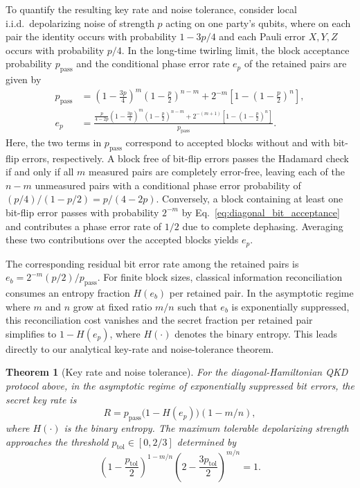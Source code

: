 \documentclass[onecolumn,prx,longbibliography,nofootinbib, superscriptaddress]{revtex4-2}
\newtheorem{theorem}{Theorem}
\theoremstyle{recap}
\begin{document}
To quantify the resulting key rate and noise tolerance, consider local i.i.d.\ depolarizing noise of strength $p$ acting on one party's qubits, where on each pair the identity occurs with probability $1-3p/4$ and each Pauli error $X,Y,Z$ occurs with probability $p/4$. In the long-time twirling limit, the block acceptance probability $p_{\mathrm{pass}}$ and the conditional phase error rate $e_p$ of the retained pairs are given by
\begin{equation}\label{eq:QKD_parameters}
\begin{split}
    p_{\mathrm{pass}}&=\left(1-\frac{3p}{4}\right)^m\left(1-\frac{p}{2}\right)^{n-m}
    +2^{-m}\left[1-\left(1-\frac{p}{2}\right)^n\right],\\
    e_p&=\frac{\frac{p}{4-2p}\left(1-\frac{3p}{4}\right)^m\left(1-\frac{p}{2}\right)^{n-m}
    +2^{-(m+1)}\left[1-\left(1-\frac{p}{2}\right)^n\right]}{p_{\mathrm{pass}}}.
\end{split}
\end{equation}
Here, the two terms in $p_{\mathrm{pass}}$ correspond to accepted blocks without and with bit-flip errors, respectively. A block free of bit-flip errors passes the Hadamard check if and only if all $m$ measured pairs are completely error-free, leaving each of the $n-m$ unmeasured pairs with a conditional phase error probability of $(p/4)/(1-p/2)=p/(4-2p)$. Conversely, a block containing at least one bit-flip error passes with probability $2^{-m}$ by Eq.~\eqref{eq:diagonal_bit_acceptance} and contributes a phase error rate of $1/2$ due to complete dephasing. Averaging these two contributions over the accepted blocks yields $e_p$.

The corresponding residual bit error rate among the retained pairs is $e_b=2^{-m}(p/2)/p_{\mathrm{pass}}$. For finite block sizes, classical information reconciliation consumes an entropy fraction $H(e_b)$ per retained pair. In the asymptotic regime where $m$ and $n$ grow at fixed ratio $m/n$ such that $e_b$ is exponentially suppressed, this reconciliation cost vanishes and the secret fraction per retained pair simplifies to $1-H(e_p)$, where $H(\cdot)$ denotes the binary entropy. This leads directly to our analytical key-rate and noise-tolerance theorem.

\begin{theorem}[Key rate and noise tolerance]\label{lemma:diagonal+classical}
    For the diagonal-Hamiltonian QKD protocol above, in the asymptotic regime of exponentially suppressed bit errors, the secret key rate is
    \begin{equation}
        R=p_{\mathrm{pass}}\bigl(1-H(e_p)\bigr)(1-m/n),
    \end{equation}
    where $H(\cdot)$ is the binary entropy. The maximum tolerable depolarizing strength approaches the threshold $p_{\mathrm{tol}}\in[0,2/3]$ determined by
    \begin{equation}\label{eq:tolerance}
        \left(1-\frac{p_{\mathrm{tol}}}{2}\right)^{1-m/n}
        \left(2-\frac{3p_{\mathrm{tol}}}{2}\right)^{m/n}=1.
    \end{equation}
\end{theorem}
\end{document}
